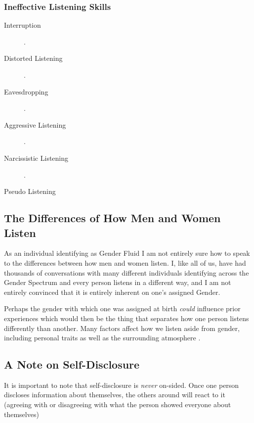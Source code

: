 \documentclass[stu,12pt]{apa7}
\begin{document}
      \subsubsection{Ineffective Listening Skills}
          \begin{description}
            \item[Interruption]
              \parencite[pp. 351--352]{noauthor_communication_2013}.
            \item[Distorted Listening]
              \parencite[pp. 352]{noauthor_communication_2013}.
            \item[Eavesdropping]
              \parencite[pp. 353--354]{noauthor_communication_2013}.
            \item[Aggressive Listening]
              \parencite[pp. 354--355]{noauthor_communication_2013}.
            \item[Narcissistic Listening]
              \parencite[pp. 355--356]{noauthor_communication_2013}.
            \item[Pseudo Listening]
              \parencite[pp. 356--357]{noauthor_communication_2013}
          \end{description}


    \subsection{The Differences of How Men and Women Listen}
      As an individual identifying as Gender Fluid I am not entirely sure how
        to speak to the differences between how men and women listen. I, like
        all of us, have had thousands of conversations with many different
        individuals identifying across the Gender Spectrum and every person
        listens in a different way, and I am not entirely convinced that it is
        entirely inherent on one's assigned Gender.

      Perhaps the gender with which one was assigned at birth \textit{could}
        influence prior experiences which would then be the thing that separates
        how one person listens differently than another. Many factors affect
        how we listen aside from gender, including personal traits as well as
        the surrounding atmosphere \parencite[pp. 6]{caspersz_can_nodate}.

    \subsection{A Note on Self-Disclosure}
      It is important to note that self-disclosure is \textit{never} on-sided.
        Once one person discloses information about themselves, the others
        around will react to it (agreeing with or disagreeing with what the
        person showed everyone about themselves)
        \parencite[pp. 463]{noauthor_communication_2013}
\end{document}
